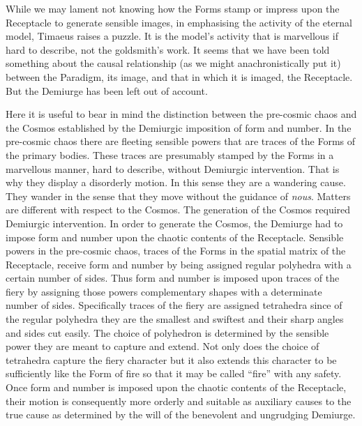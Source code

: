 While we may lament not knowing how the Forms stamp or impress upon the Receptacle to generate sensible images, in emphasising the activity of the eternal model, Timaeus raises a puzzle. It is the model's activity that is marvellous if hard to describe, not the goldsmith's work. It seems that we have been told something about the causal relationship (as we might anachronistically put it) between the Paradigm, its image, and that in which it is imaged, the Receptacle. But the Demiurge has been left out of account.

Here it is useful to bear in mind the distinction between the pre-cosmic chaos and the Cosmos established by the Demiurgic imposition of form and number. In the pre-cosmic chaos there are fleeting sensible powers that are traces of the Forms of the primary bodies. These traces are presumably stamped by the Forms in a marvellous manner, hard to describe, without Demiurgic intervention. That is why they display a disorderly motion. In this sense they are a wandering cause. They wander in the sense that they move without the guidance of \emph{nous}. Matters are different with respect to the Cosmos. The generation of the Cosmos required Demiurgic intervention. In order to generate the Cosmos, the Demiurge had to impose form and number upon the chaotic contents of the Receptacle. Sensible powers in the pre-cosmic chaos, traces of the Forms in the spatial matrix of the Receptacle, receive form and number by being assigned regular polyhedra with a certain number of sides. Thus form and number is imposed upon traces of the fiery by assigning those powers complementary shapes with a determinate number of sides. Specifically traces of the fiery are assigned tetrahedra since of the regular polyhedra they are the smallest and swiftest and their sharp angles and sides cut easily. The choice of polyhedron is determined by the sensible power they are meant to capture and extend. Not only does the choice of tetrahedra capture the fiery character but it also extends this character to be sufficiently like the Form of fire so that it may be called ``fire'' with any safety.  Once form and number is imposed upon the chaotic contents of the Receptacle, their motion is consequently more orderly and suitable as auxiliary causes to the true cause as determined by the will of the benevolent and ungrudging Demiurge. 

